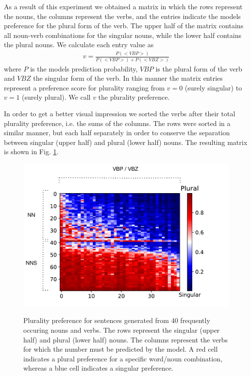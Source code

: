 As a result of this experiment we obtained a matrix in which 
the rows represent the nouns,
the columns represent the verbs, and
the entries indicate the models preference for the plural form of the verb. 
The upper half of the matrix contains all noun-verb combinations for the singular nouns, while the lower half contains the plural nouns. 
We calculate each entry value as
\begin{align*}
	v = \frac{P(<VBP>)}{P(<VBP>) + P(<VBZ>)} 
\end{align*}
where $P$ is the models prediction probability, $VBP$ is the plural 
form of the verb and $VBZ$ the singular form of the verb. 
In this manner the matrix entries represent 
a preference score for plurality ranging from
$v=0$ (surely singular) to $v=1$ (surely plural). 
We call $v$ the plurality preference. 

In order to get a better visual impression we sorted the verbs 
after their total plurality preference, i.e. the sums of the columns. 
The rows were sorted in a similar manner, but each half separately in order to conserve the separation between singular (upper half) and plural (lower half) nouns. The resulting matrix is shown in Fig. \ref{fig:matrix_ratio}.

    \begin{figure}[t]
    \centering
        \includegraphics[scale=0.5]{matrix_plot_ratio.pdf}
        \label{fig:matrix_ratio}
        \caption{Plurality preference for sentences generated from 40 frequently
        occuring nouns and verbs. The rows represent the 
        singular (upper half) and plural (lower half) nouns.
        The columns represent the verbs for which the number must
        be predicted by the model. 
        A red cell indicates a plural preference for a specific word/noun 
        combination, whereas a blue 
        cell indicates a singular preference. }
    \end{figure}


